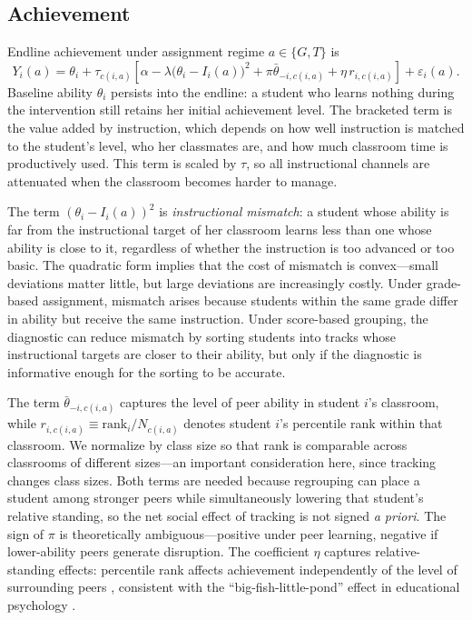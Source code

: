 \documentclass[11pt]{article}
\begin{document}
\subsection{Achievement}

Endline achievement under assignment regime $a \in \{G, T\}$ is
\begin{equation}
\label{eq:learning}
Y_i(a) = \theta_i + \tau_{c(i,a)} \left[\alpha - \lambda\big(\theta_i - I_i(a)\big)^2 + \pi\bar{\theta}_{-i,c(i,a)} + \eta\, r_{i,c(i,a)}\right] + \varepsilon_i(a).
\end{equation}
Baseline ability $\theta_i$ persists into the endline: a student who learns nothing during the intervention still retains her initial achievement level. The bracketed term is the value added by instruction, which depends on how well instruction is matched to the student's level, who her classmates are, and how much classroom time is productively used. This term is scaled by $\tau$, so all instructional channels are attenuated when the classroom becomes harder to manage.

The term $(\theta_i - I_i(a))^2$ is \emph{instructional mismatch}: a student whose ability is far from the instructional target of her classroom learns less than one whose ability is close to it, regardless of whether the instruction is too advanced or too basic. The quadratic form implies that the cost of mismatch is convex---small deviations matter little, but large deviations are increasingly costly. Under grade-based assignment, mismatch arises because students within the same grade differ in ability but receive the same instruction. Under score-based grouping, the diagnostic can reduce mismatch by sorting students into tracks whose instructional targets are closer to their ability, but only if the diagnostic is informative enough for the sorting to be accurate.

The term $\bar{\theta}_{-i,c(i,a)}$ captures the level of peer ability in student $i$'s classroom, while $r_{i,c(i,a)} \equiv \text{rank}_i / N_{c(i,a)}$ denotes student $i$'s percentile rank within that classroom. We normalize by class size so that rank is comparable across classrooms of different sizes---an important consideration here, since tracking changes class sizes. Both terms are needed because regrouping can place a student among stronger peers while simultaneously lowering that student's relative standing, so the net social effect of tracking is not signed \emph{a priori}. The sign of $\pi$ is theoretically ambiguous---positive under peer learning, negative if lower-ability peers generate disruption. The coefficient $\eta$ captures relative-standing effects: percentile rank affects achievement independently of the level of surrounding peers \citep{murphy2020top, elsner2021rank}, consistent with the ``big-fish-little-pond'' effect in educational psychology \citep{hoxby2005taking}.
\end{document}
